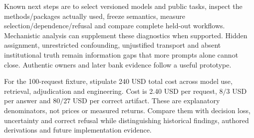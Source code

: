 Known next steps are to select versioned models and public tasks, inspect the methods/packages actually used, freeze semantics, measure selection/dependence/refusal and compare complete held-out workflows. Mechanistic analysis can supplement these diagnostics when supported. Hidden assignment, unrestricted confounding, unjustified transport and absent institutional truth remain information gaps that more prompts alone cannot close. Authentic owners and later bank evidence follow a useful prototype.\citep{exec24_css_knowledge_reference}

For the 100-request fixture, stipulate 240 USD total cost across model use, retrieval, adjudication and engineering. Cost is 2.40 USD per request, $8/3$ USD per answer and $80/27$ USD per correct artifact. These are explanatory denominators, not prices or measured returns. Compare them with decision loss, uncertainty and correct refusal while distinguishing historical findings, authored derivations and future implementation evidence.\citep{exec24_css_knowledge_reference}
